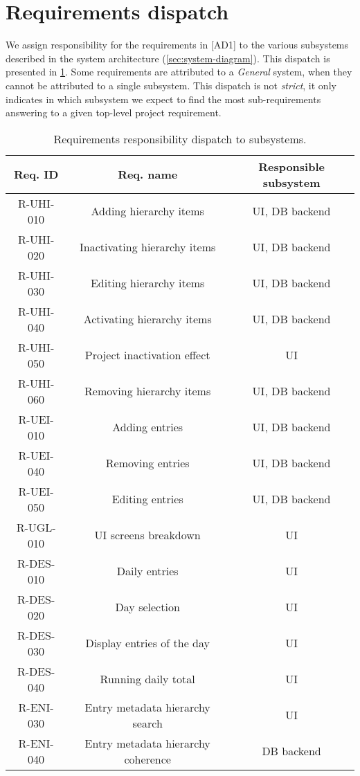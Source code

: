 \section{Requirements dispatch} \label{sec:req-dispatch}
We assign responsibility for the requirements in [AD1] to the various subsystems
described in the system architecture (\cref{sec:system-diagram}). This dispatch
is presented in \cref{tab:req-dispatch}. Some requirements are attributed
to a \emph{General} system, when they cannot be attributed to a single
subsystem. This dispatch is not \emph{strict}, it only indicates in which
subsystem we expect to find the most sub-requirements answering to a given
top-level project requirement.

\begin{longtable}{| c | c | c |}
  \caption{\label{tab:req-dispatch} Requirements responsibility dispatch to
    subsystems.} \\ \hline
  \textbf{Req. ID} & \textbf{Req. name} & \textbf{Responsible subsystem} \\ \hline
  R-UHI-010 & Adding hierarchy items & UI, DB backend \\ \hline
  R-UHI-020 & Inactivating hierarchy items & UI, DB backend \\ \hline
  R-UHI-030 & Editing hierarchy items & UI, DB backend \\ \hline
  R-UHI-040 & Activating hierarchy items & UI, DB backend \\ \hline
  R-UHI-050 & Project inactivation effect & UI \\ \hline
  R-UHI-060 & Removing hierarchy items & UI, DB backend \\ \hline
  R-UEI-010 & Adding entries & UI, DB backend \\ \hline
  R-UEI-040 & Removing entries & UI, DB backend \\ \hline
  R-UEI-050 & Editing entries & UI, DB backend \\ \hline
  R-UGL-010 & UI screens breakdown & UI \\ \hline
  R-DES-010 & Daily entries & UI \\ \hline
  R-DES-020 & Day selection & UI \\ \hline
  R-DES-030 & Display entries of the day & UI \\ \hline
  R-DES-040 & Running daily total & UI \\ \hline
  R-ENI-030 & Entry metadata hierarchy search & UI \\ \hline
  R-ENI-040 & Entry metadata hierarchy coherence & DB backend \\ \hline

\end{longtable}
